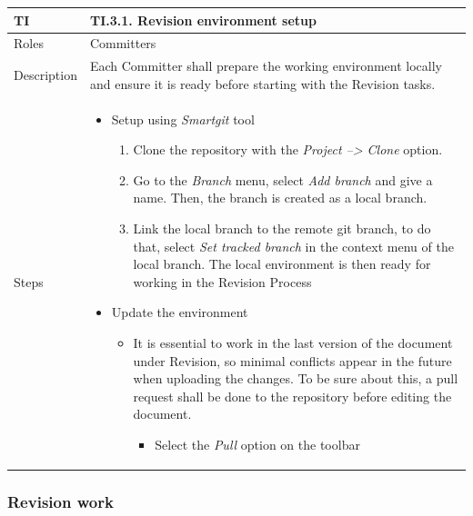 \documentclass{template/openetcs_article}
\begin{document}
\begin{flushleft}
\tablefirsthead{}
\tablehead{}
\tabletail{}
\tablelasttail{}
\begin{supertabular}{|m{2cm}|m{13cm}|}
\hline
{}
TI & 
TI.3.1. Revision environment setup
\\\hline
Roles &
Committers
\\\hline
Description &
Each Committer shall prepare the working environment locally and ensure it is ready before starting with the Revision tasks.
\\\hline
Steps &
\begin{itemize}
\item Setup using {\it Smartgit} tool
\begin{enumerate}
\item Clone the repository with the {\it Project --> Clone} option.
\item Go to the {\it Branch} menu, select {\it Add branch} and give a name. Then, the branch is created as a local branch.
\item Link the local branch to the remote git branch, to do that, select {\it Set tracked branch} in the context menu of the local branch. The local environment is then ready for working in the Revision Process
\end{enumerate}
\item Update the environment
\begin{itemize}
\item It is essential to work in the last version of the document under Revision, so minimal conflicts appear in the future when uploading the changes. To be sure about this, a pull request shall be done to the repository before editing the document.
\begin{itemize}
\item Select the {\it Pull} option on the toolbar
\end{itemize}
\end{itemize}
\end{itemize}
\\\hline
\end{supertabular}
\end{flushleft}

\subsubsection{Revision work}
\end{document}
